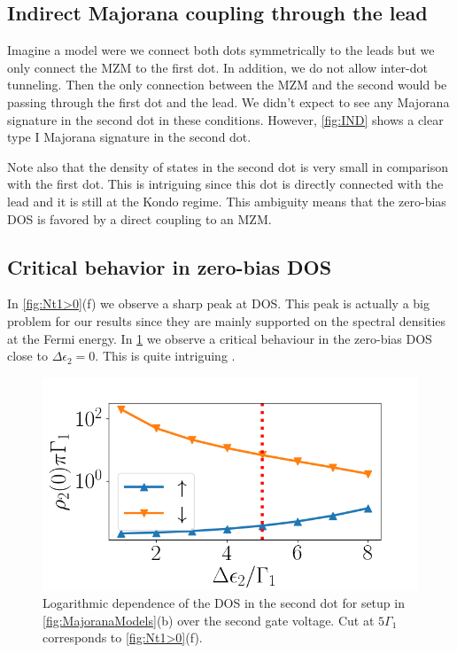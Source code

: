 \subsection{Indirect Majorana coupling through the lead}

Imagine a model were we connect both dots symmetrically to the leads but we only connect the MZM to the first dot. In addition, we do not allow inter-dot tunneling. Then the only connection between the MZM and the second would be passing through the first dot and  the lead. We didn't expect to see any Majorana signature in the second dot in these conditions. However, \ref{fig:IND} shows a clear type I Majorana signature in the second dot.




 Note also that the density of states in the second dot is very small in comparison with the first dot. This is intriguing since this dot is directly connected with the lead and it is still at the Kondo regime. This ambiguity means that the zero-bias DOS is favored by a direct coupling to an MZM.  

\subsection{Critical behavior in  zero-bias DOS }

In \ref{fig:Nt1>0}(f) we observe a sharp peak at DOS. This peak is actually a big problem for our results since they are mainly supported on the spectral densities at the Fermi energy. In \ref{fig:Critical} we observe a critical behaviour in the zero-bias DOS close to $\Delta\epsilon_2 =0$. This is quite intriguing . 


\begin{figure}[t]
\centering
\includegraphics[scale=0.5]{IMAGES/NRG/Critical.png}
\caption{\label{fig:Critical} Logarithmic dependence of the DOS in the second dot for setup in \ref{fig:MajoranaModels}(b) over the second gate voltage. Cut at $5\Gamma_1$ corresponds to \ref{fig:Nt1>0}(f). \protect{} }
\end{figure} 

